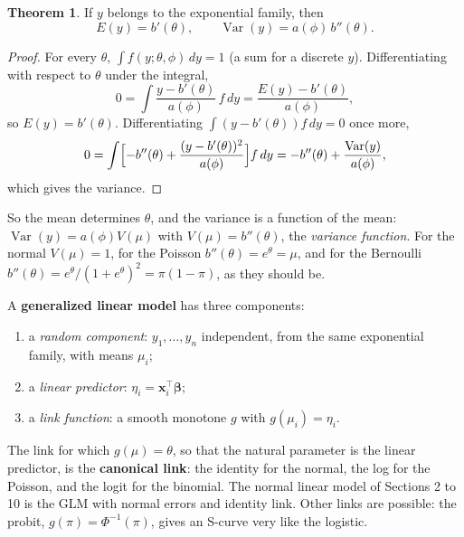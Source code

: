 \documentclass[11pt,a4paper]{article}
\numberwithin{equation}{section}
\theoremstyle{definition}
\newtheorem{thm}{Theorem}[subsection]
\begin{document}
\begin{thm}\label{thm:expfam-moments}
If $y$ belongs to the exponential family, then
\[
E(y) = b'(\theta) , \qquad \operatorname{Var}(y) = a(\phi)\,b''(\theta) .
\]
\end{thm}

\begin{proof}
For every $\theta$, $\int f(y; \theta, \phi)\,dy = 1$ (a sum for a discrete $y$). Differentiating with respect to $\theta$ under the integral,
\[
0 = \int \frac{y - b'(\theta)}{a(\phi)}\,f\,dy = \frac{E(y) - b'(\theta)}{a(\phi)} ,
\]
so $E(y) = b'(\theta)$. Differentiating $\int (y - b'(\theta))f\,dy = 0$ once more,
\[
0 = \int\Bigl[-b''(\theta) + \frac{(y - b'(\theta))^2}{a(\phi)}\Bigr]f\,dy = -b''(\theta) + \frac{\operatorname{Var}(y)}{a(\phi)} ,
\]
which gives the variance.
\end{proof}

So the mean determines $\theta$, and the variance is a function of the mean: $\operatorname{Var}(y) = a(\phi)V(\mu)$ with
$V(\mu) = b''(\theta)$, the \emph{variance function}. For the normal $V(\mu) = 1$, for the Poisson $b''(\theta) = e^\theta = \mu$, and for the
Bernoulli $b''(\theta) = e^\theta/(1 + e^\theta)^2 = \pi(1 - \pi)$, as they should be.

A \textbf{generalized linear model} has three components:
\begin{enumerate}[label=(\arabic*)]
\item a \emph{random component}: $y_1, \dots, y_n$ independent, from the same exponential family, with means $\mu_i$;
\item a \emph{linear predictor}: $\eta_i = \mathbf{x}_i^\top\boldsymbol\beta$;
\item a \emph{link function}: a smooth monotone $g$ with $g(\mu_i) = \eta_i$.
\end{enumerate}
The link for which $g(\mu) = \theta$, so that the natural parameter is the linear predictor, is the \textbf{canonical link}:
the identity for the normal, the log for the Poisson, and the logit for the binomial. The normal linear model of
Sections 2 to 10 is the GLM with normal errors and identity link. Other links are possible: the probit,
$g(\pi) = \Phi^{-1}(\pi)$, gives an S-curve very like the logistic.
\end{document}
